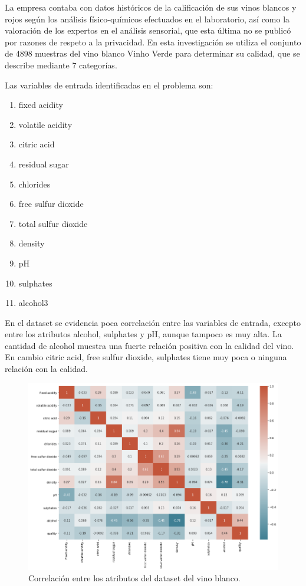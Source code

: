 \documentclass[runningheads]{llncs}
\begin{document}
La empresa contaba con datos hist{\'o}ricos de la calificaci{\'o}n de sus vinos blancos y rojos seg{\'u}n los an{\'a}lisis f{\'i}sico-qu{\'i}micos efectuados en el laboratorio, así como la valoración de los expertos en el análisis sensorial, que esta {\'u}ltima no se public{\'o} por razones de respeto a la privacidad. En esta investigaci{\'o}n se utiliza el conjunto de 4898 muestras del vino blanco Vinho Verde para determinar su calidad, que se describe mediante 7 categor{\'i}as.

Las variables de entrada identificadas en el problema son:
\begin{enumerate}
	\item fixed acidity
	\item volatile acidity
	\item citric acid
	\item residual sugar
	\item chlorides
	\item free sulfur dioxide
	\item total sulfur dioxide
	\item density
	\item pH
	\item sulphates
	\item alcohol3
\end{enumerate}

En el dataset se evidencia poca correlaci{\'o}n entre las variables de entrada, excepto entre los atributos alcohol, sulphates y pH, aunque tampoco es muy alta. La cantidad de alcohol muestra una fuerte relaci{\'o}n positiva con la calidad del vino. En cambio citric acid, free sulfur dioxide, sulphates tiene muy poca o ninguna relaci{\'o}n con la calidad.

\begin{figure}
	\begin{center}
		\includegraphics[width=1\textwidth]{images/matrix.png}
		\caption{Correlaci{\'o}n entre los atributos del dataset del vino blanco.} \label{matrix}
	\end{center}
\end{figure}
\end{document}
